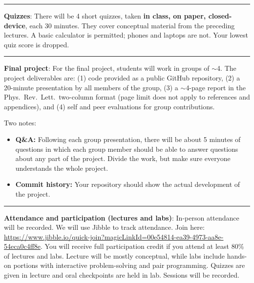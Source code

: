 \documentclass[12pt]{article}
\begin{document}
\begin{center}
  \rule{\textwidth}{0.5pt}
\end{center}

\noindent\textbf{Quizzes}: There will be 4 short quizzes, taken \textbf{in class, on paper, closed-device}, each 30 minutes.
They cover conceptual material from the preceding lectures.
A basic calculator is permitted; phones and laptops are not.
Your lowest quiz score is dropped.

\begin{center}
  \rule{\textwidth}{0.5pt}
\end{center}

\noindent\textbf{Final project}:
For the final project, students will work in groups of $\sim$4.
The project deliverables are: (1) code provided as a public GitHub repository, (2) a 20-minute presentation by all members of the group, (3) a $\sim$4-page report in the Phys.\ Rev.\ Lett.\ two-column format (page limit does not apply to references and appendices), and (4) self and peer evaluations for group contributions.

Two notes:
\begin{itemize}
  \itemsep-0.3em
  \item \textbf{Q\&A:} Following each group presentation, there will be about 5 minutes of questions in which each group member should be able to answer questions about any part of the project. Divide the work, but make sure everyone understands the whole project.
  \item \textbf{Commit history:} Your repository should show the actual development of the project.
\end{itemize}

\begin{center}
  \rule{\textwidth}{0.5pt}
\end{center}

\noindent\textbf{Attendance and participation (lectures and labs)}: In-person attendance will be recorded.
We will use Jibble to track attendance.
Join here: \href{https://www.jibble.io/quick-join?magicLinkId=00e54814-ea39-4973-aa8e-54eca0c4ff8e}{https://www.jibble.io/quick-join?magicLinkId=00e54814-ea39-4973-aa8e-54eca0c4ff8e}.
You will receive full participation credit if you attend at least 80\% of lectures and labs.
Lecture will be mostly conceptual, while labs include hands-on portions with interactive problem-solving and pair programming.
Quizzes are given in lecture and oral checkpoints are held in lab.
Sessions will be recorded.
\end{document}
